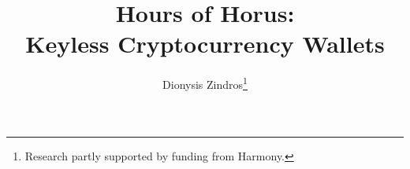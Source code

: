 \title{
  Hours of Horus:\\
  Keyless Cryptocurrency Wallets
}
\ifanonymous{\iflncs
\author{}\institute{}
\fi}
\else
\author{
        Dionysis Zindros\thanks{Research partly supported by funding from Harmony.}
}
\iflncs
{}
\else
{}
\fi
\fi
